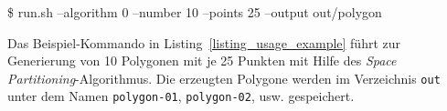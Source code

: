 \begin{code}[caption={Beispiel-Ausführung},label=listing_usage_example]
\$ run.sh --algorithm 0 --number 10 --points 25 --output out/polygon
\end{code}

Das Beispiel-Kommando in Listing~\ref{listing_usage_example} führt zur Generierung von 10 Polygonen mit je 25 Punkten mit Hilfe des \emph{Space Partitioning}-Algorithmus. Die erzeugten Polygone werden im Verzeichnis \texttt{out} unter dem Namen \texttt{polygon-01}, \texttt{polygon-02}, usw. gespeichert.

